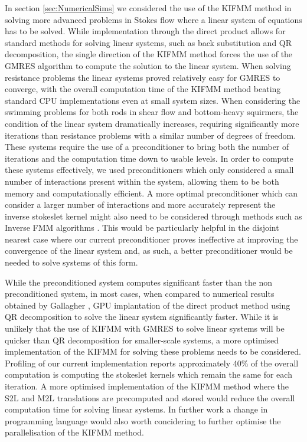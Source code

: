 In section \ref{sec:NumericalSims} we considered the use of the KIFMM method in solving more advanced problems in Stokes flow where a linear system of equations has to be solved. While implementation through the direct product allows for standard methods for solving linear systems, such as back substitution and QR decomposition, the single direction of the KIFMM method forces the use of the GMRES algorithm to compute the solution to the linear system. When solving resistance problems the linear systems proved relatively easy for GMRES to converge, with the overall computation time of the KIFMM method beating standard CPU implementations even at small system sizes. When considering the swimming problems for both rods in shear flow and bottom-heavy squirmers, the condition of the linear system dramatically increases, requiring significantly more iterations than resistance problems with a similar number of degrees of freedom. These systems require the use of a preconditioner to bring both the number of iterations and the computation time down to usable levels. In order to compute these systems effectively, we used preconditioners which only considered a small number of interactions present within the system, allowing them to be both memory and computationally efficient. A more optimal preconditioner which can consider a larger number of interactions and more accurately represent the inverse stokeslet kernel might also need to be considered through methods such as Inverse FMM algorithms \cite{Ambikasaran2014TheMethod,Coulier2017TheSystems,Alleon1997SparseElectromagnetics}. This would be particularly helpful in the disjoint nearest case where our current preconditioner proves ineffective at improving the convergence of the linear system and, as such, a better preconditioner would be needed to solve systems of this form. 

While the preconditioned system computes significant faster than the non preconditioned system, in most cases, when compared to numerical results obtained by Gallagher \cite{Gallagher2020}, GPU implantation of the direct product method using QR decomposition to solve the linear system significantly faster. While it is unlikely that the use of KIFMM with GMRES to solve linear systems will be quicker than QR decomposition for smaller-scale systems, a more optimised implementation of the KIFMM for solving these problems needs to be considered. Profiling of our current implementation reports approximately 40\% of the overall computation is computing the stokeslet kernels which remain the same for each iteration. A more optimised implementation of the KIFMM method where the S2L and M2L translations are precomputed and stored would reduce the overall computation time for solving linear systems. In further work a change in programming language would also worth concidering to further optimise the parallelisation of the KIFMM method. 


